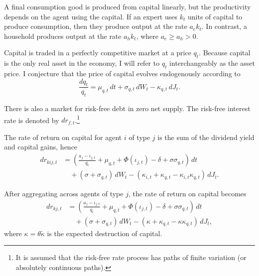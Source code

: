 \documentclass[12 pt, oneside]{article}
\theoremstyle{definition}
\theoremstyle{definition}
\theoremstyle{definition}
\begin{document}
A final consumption good is produced from capital linearly, but the productivity depends on the agent using the capital.
If an expert uses $k_t$ units of capital to produce consumption, then they produce output at the rate $a_ek_t$. In contrast,
a household produces output at the rate $a_hk_t$, where $a_e \geq a_h  > 0$.

Capital is traded in a perfectly competitive market at a price $q_t$. Because capital is the only real asset in the economy,
I will refer to $q_t$ interchangeably as the asset price. I conjecture that the price of capital evolves endogenously according to
\begin{equation}
  \label{eq:asset price law of motion}
  \frac{dq_t}{q_t} = \mu_{q, t}\, dt + \sigma_{q, t}\, dW_t - \kappa_{q, t}\, dJ_t.
\end{equation}

There is also a market for risk-free debt in zero net supply. The risk-free interest rate is denoted by
$dr_{f, t}$.\footnote{It is assumed that the risk-free rate process has paths of finite variation (or absolutely continuous paths).}

The rate of return on capital for agent $i$ of type $j$ is the sum of the dividend yield and capital gains, hence
\begin{equation}
  \label{eq:idiosyncratic return on risky capital}
  \begin{split}
    dr_{kij, t} & =\left( \frac{a_j - \iota_{j, t}}{q_t} + \mu_{q, t} + \Phi(\iota_{j, t}) - \delta  + \sigma\sigma_{q, t} \right)\,dt    \\
    & \quad + (\sigma + \sigma_{q, t}) \, dW_t - (\kappa_{i, t} + \kappa_{q, t} - \kappa_{i, t} \kappa_{q, t})\, dJ_t.
  \end{split}
\end{equation}

After aggregating across agents of type $j$, the rate of return on capital becomes
\begin{equation}
  \label{eq:return on risky capital}
  \begin{split}
    dr_{kj, t} & =\left( \frac{a_j - \iota_{j, t}}{q_t} + \mu_{q, t} + \Phi(\iota_{j, t}) - \delta  + \sigma\sigma_{q, t} \right)\,dt    \\
    & \quad + (\sigma + \sigma_{q, t}) \, dW_t - (\kappa + \kappa_{q, t} - \kappa \kappa_{q, t})\, dJ_t,
  \end{split}
\end{equation}
where $\kappa = \theta\tilde{\kappa}$ is the expected destruction of capital.
\end{document}
